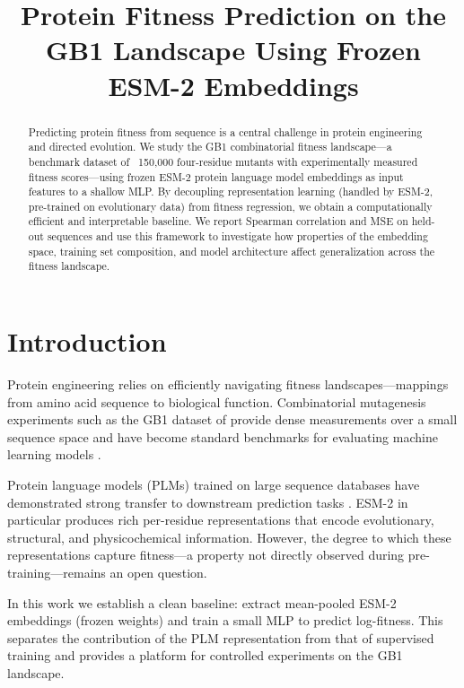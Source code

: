 \documentclass{article}
\title{Protein Fitness Prediction on the GB1 Landscape Using Frozen ESM-2 Embeddings}
\begin{document}
\maketitle

\begin{abstract}
Predicting protein fitness from sequence is a central challenge in protein engineering and directed evolution. We study the GB1 combinatorial fitness landscape—a benchmark dataset of ~150,000 four-residue mutants with experimentally measured fitness scores—using frozen ESM-2 protein language model embeddings as input features to a shallow MLP. By decoupling representation learning (handled by ESM-2, pre-trained on evolutionary data) from fitness regression, we obtain a computationally efficient and interpretable baseline. We report Spearman correlation and MSE on held-out sequences and use this framework to investigate how properties of the embedding space, training set composition, and model architecture affect generalization across the fitness landscape.
\end{abstract}

\section{Introduction}
\label{sec:intro}

Protein engineering relies on efficiently navigating fitness landscapes—mappings from amino acid sequence to biological function. Combinatorial mutagenesis experiments such as the GB1 dataset of \citet{wu2016adaptation} provide dense measurements over a small sequence space and have become standard benchmarks for evaluating machine learning models \citep{dallago2021flip}.

Protein language models (PLMs) trained on large sequence databases have demonstrated strong transfer to downstream prediction tasks \citep{rives2021biological, lin2023evolutionary}. ESM-2 \citep{lin2023evolutionary} in particular produces rich per-residue representations that encode evolutionary, structural, and physicochemical information. However, the degree to which these representations capture fitness—a property not directly observed during pre-training—remains an open question.

In this work we establish a clean baseline: extract mean-pooled ESM-2 embeddings (frozen weights) and train a small MLP to predict log-fitness. This separates the contribution of the PLM representation from that of supervised training and provides a platform for controlled experiments on the GB1 landscape.
\end{document}
